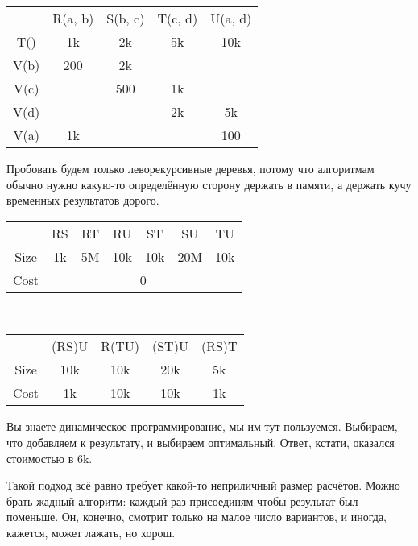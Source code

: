 \begin{center}\begin{tabular}{c|cccc}
	     & R(a, b) & S(b, c) & T(c, d) & U(a, d) \\
	T()  & 1k      & 2k      & 5k      & 10k     \\
	V(b) & 200     & 2k      &         &\\
	V(c) &         & 500     & 1k      &\\
	V(d) &         &         & 2k      & 5k   \\
	V(a) & 1k      &         &         & 100
\end{tabular}\end{center}
Пробовать будем только леворекурсивные деревья, потому что алгоритмам обычно нужно какую-то определённую сторону держать в памяти,
а держать кучу временных результатов дорого.
\begin{center}\begin{tabular}{c|cccccc}
	     & RS & RT & RU  & ST  & SU  & TU \\
	Size & 1k & 5M & 10k & 10k & 20M & 10k \\
	Cost & \multicolumn{6}{c}{0}
\end{tabular}\\\begin{tabular}{c|cccc}
	     & (RS)U & R(TU) & (ST)U & (RS)T \\
	Size & 10k   & 10k   & 20k   & 5k \\
	Cost & 1k    & 10k   & 10k   & 1k
\end{tabular}\end{center}
Вы знаете динамическое программирование, мы им тут пользуемся.
Выбираем, что добавляем к результату, и выбираем оптимальный.
Ответ, кстати, оказался стоимостью в 6k.

Такой подход всё равно требует какой-то неприличный размер расчётов.
Можно брать жадный алгоритм: каждый раз присоединям чтобы результат был поменьше.
Он, конечно, смотрит только на малое число вариантов, и иногда, кажется, может лажать, но хорош.
